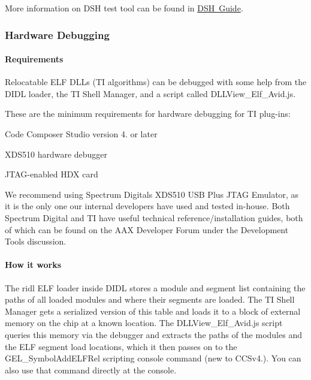 More information on D\+SH test tool can be found in \mbox{\hyperlink{a00835}{D\+SH Guide}}.

\hypertarget{a00832_subsection__hardware_debugging}{}\subsubsection{Hardware Debugging}\label{a00832_subsection__hardware_debugging}
 \hypertarget{a00832_subsubsection__requirements_}{}\paragraph{Requirements}\label{a00832_subsubsection__requirements_}
 Relocatable E\+LF D\+L\+Ls (TI algorithms) can be debugged with some help from the D\+I\+DL loader, the TI Shell Manager, and a script called D\+L\+L\+View\+\_\+\+Elf\+\_\+\+Avid.\+js.

These are the minimum requirements for hardware debugging for TI plug-\/ins\+: 
\begin{DoxyItemize}
\item Code Composer Studio version 4. or later  
\item X\+D\+S510 hardware debugger  
\item J\+T\+A\+G-\/enabled H\+DX card  
\end{DoxyItemize}

We recommend using Spectrum Digital\textquotesingle{}s X\+D\+S510 U\+SB Plus J\+T\+AG Emulator, as it is the only one our internal developers have used and tested in-\/house. Both Spectrum Digital and TI have useful technical reference/installation guides, both of which can be found on the A\+AX Developer Forum under the \textquotesingle{}Development Tools\textquotesingle{} discussion.

\hypertarget{a00832_subsubsection__how_it_works_}{}\paragraph{How it works}\label{a00832_subsubsection__how_it_works_}
 The ridl E\+LF loader inside D\+I\+DL stores a module and segment list containing the paths of all loaded modules and where their segments are loaded. The TI Shell Manager gets a serialized version of this table and loads it to a block of external memory on the chip at a known location. The D\+L\+L\+View\+\_\+\+Elf\+\_\+\+Avid.\+js script queries this memory via the debugger and extracts the paths of the modules and the E\+LF segment load locations, which it then passes on to the {\ttfamily G\+E\+L\+\_\+\+Symbol\+Add\+E\+L\+F\+Rel} scripting console command (new to C\+C\+Sv4.). You can also use that command directly at the console.

